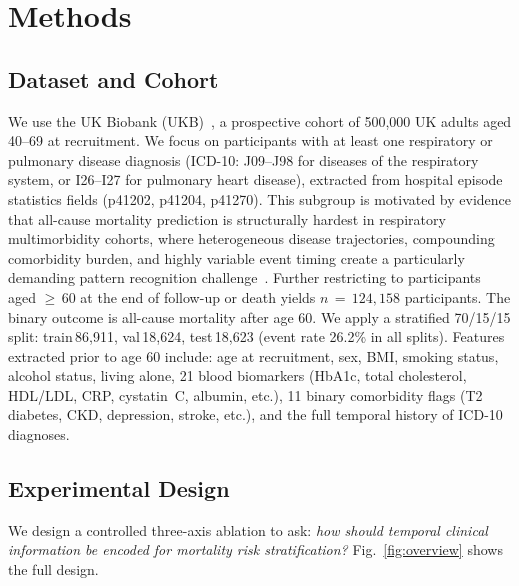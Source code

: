 \section{Methods}

\subsection{Dataset and Cohort}
We use the UK Biobank (UKB)~\cite{ukbiobank}, a prospective cohort of
500{,}000 UK adults aged 40--69 at recruitment.
We focus on participants with at least one respiratory or pulmonary disease
diagnosis (ICD-10: J09--J98 for diseases of the respiratory system, or
I26--I27 for pulmonary heart disease), extracted from hospital episode
statistics fields (p41202, p41204, p41270).
This subgroup is motivated by evidence that all-cause mortality prediction
is structurally hardest in respiratory multimorbidity cohorts, where
heterogeneous disease trajectories, compounding comorbidity burden, and
highly variable event timing create a particularly demanding pattern
recognition challenge~\cite{ukbmdrmf,cao2025respiratoryburden,cao2026copd}.
Further restricting to participants aged $\geq$\,60 at the end of follow-up
or death yields $n\,=\,124{,}158$ participants.
The binary outcome is all-cause mortality after age 60.
We apply a stratified 70/15/15 split: train\,86{,}911,
val\,18{,}624, test\,18{,}623 (event rate 26.2\% in all splits).
Features extracted prior to age 60 include: age at recruitment, sex, BMI,
smoking status, alcohol status, living alone, 21 blood biomarkers
(HbA1c, total cholesterol, HDL/LDL, CRP, cystatin~C, albumin, etc.),
11 binary comorbidity flags (T2 diabetes, CKD, depression, stroke, etc.),
and the full temporal history of ICD-10 diagnoses.

\subsection{Experimental Design}
\label{sec:design}
We design a controlled three-axis ablation to ask:
\emph{how should temporal clinical information be encoded for mortality
risk stratification?}
Fig.~\ref{fig:overview} shows the full design.

